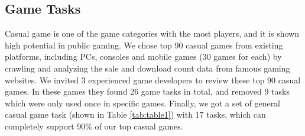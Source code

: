 \documentclass{sigchi}
\begin{document}
    \subsection {Game Tasks}
    Casual game is one of the game categories with the most players\cite{esa_ef_2014}, and it is shown high potential in public gaming\cite{Jurgelionis:2011:PET:2027456.2027462,Reis:2012:EMC:2405577.2405651,Biskupski:2014:DEB:2559206.2580097}. We chose top 90 casual games\cite{TopGames} from existing platforms, including PCs, consoles and mobile games (30 games for each) by crawling and analyzing the sale and download count data from famous gaming websites\cite{appannie,VGChartz,Steam,GameStop}. We invited 3 experienced game developers to review these top 90 casual games. In these games they found 26 game tasks in total, and removed 9 tasks which were only used once in specific games. Finally, we got a set of general casual game task (shown in Table \ref{tab:table1}) with 17 tasks, which can completely support 90\% of our top casual games. 
\end{document}
